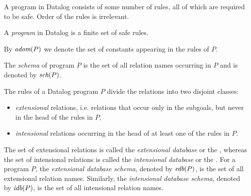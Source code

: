 A program in Datalog consists of some number of rules, all of which are required to be safe. Order of the rules is irrelevant.

\begin{defn}\label{d:datalogprog}
A \emph{program} in Datalog is a finite set of safe rules.
\end{defn}

By $\textit{adom}(P)$ we denote the set of constants appearing in the rules of $P$.

The \emph{schema} of program $P$ is the set of all relation names occurring in $P$ and is denoted by $\textit{sch}(P)$.

\begin{defn}
The rules of a Datalog program $P$ divide the relations into two disjoint classes: 
\begin{itemize}
\item \emph{extensional} relations, i.e. relations that occur only in the subgoals, but never in the head of the rules in $P$,
\item \emph{intensional} relations occurring in the head of at least one of the rules in $P$.
\end{itemize}
\end{defn}

The set of extensional relations is called the \emph{extensional database} or the \edb, whereas the set of intensional relations is called the \emph{intensional database} or the \idb. For a program $P$, the \emph{extensional database schema}, denoted by $\textit{edb}(P)$, is the set of all extensional relation names. Similarly, the \emph{intensional database schema}, denoted by $\textit{idb}(P)$, is the set of all intensional relation names. 

